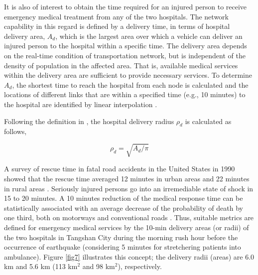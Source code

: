 \documentclass[review,11pt,nonatbib]{elsarticle}
\begin{document}
\par It is also of interest to obtain the time required for an injured person to receive emergency medical treatment from any of the two hospitals. The network capability in this regard is defined by a delivery time, in terms of hospital delivery area, $A_d$, which is the largest area over which a vehicle can deliver an injured person to the hospital within a specific time. The delivery area depends on the real-time condition of transportation network, but is independent of the density of population in the affected area. That is, available medical services within the delivery area are sufficient to provide necessary services. To determine $A_d$, the shortest time to reach the hospital from each node is calculated and the locations of different links that are within a specified time (e.g., 10 minutes) to the hospital are identified by linear interpolation \citep{feng2017post}.


\par Following the definition in \citep{feng2017post}, the hospital delivery radius $\rho_d$ is calculated as follows, 

\begin{equation}\label{delivery_radius}
\rho_d = \sqrt{A_d/\pi}
\end{equation}

A survey of rescue time in fatal road accidents in the United States in 1990 showed that the rescue time averaged 12 minutes in urban areas and 22 minutes in rural areas \citep{brodsky1990emergency}. Seriously injured persons go into an irremediable state of shock in 15 to 20 minutes. A 10 minutes reduction of the medical response time can be statistically associated with an average decrease of the probability of death by one third, both on motorways and conventional roads \citep{sanchez2010probability}. Thus, suitable metrics are defined for emergency medical services by the 10-min delivery areas (or radii) of the two hospitals in Tangshan City during the morning rush hour before the occurrence of earthquake (considering 5 minutes for stretchering patients into ambulance). Figure \ref{fig7} illustrates this concept; the delivery radii (areas) are 6.0 km and 5.6 km (113 km$^2$ and 98 km$^2$), respectively. 
\end{document}
